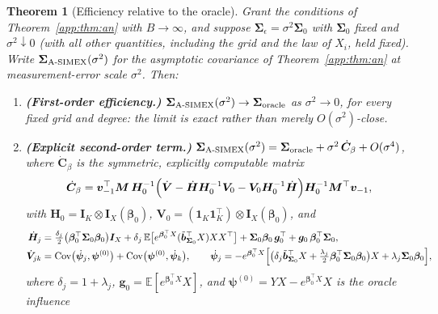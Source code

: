 \documentclass[11pt]{article}
\theoremstyle{plain}
\newtheorem{theorem}{Theorem}
\theoremstyle{definition}
\newcommand{\E}{\mathbb{E}}
\newcommand{\Cov}{\mathrm{Cov}}
\newcommand{\bet}{\bm{\beta}}
\newcommand{\bSig}{\bm{\Sigma}}
\newcommand{\btH}{\bm{H}}
\newcommand{\btV}{\bm{V}}
\newcommand{\bI}{\bm{I}}
\newcommand{\asimex}{\textup{A-SIMEX}}
\begin{document}
\begin{theorem}[Efficiency relative to the oracle]\label{app:thm:are}
Grant the conditions of Theorem~\ref{app:thm:an} with $B\to\infty$, and
suppose $\bSig_\epsilon=\sigma^2\bSig_0$ with $\bSig_0$ fixed and
$\sigma^2\downarrow0$ (with all other quantities, including the grid and
the law of $X_i$, held fixed). Write
$\bSig_{\asimex}(\sigma^2)$ for the asymptotic covariance of
Theorem~\ref{app:thm:an} at measurement-error scale $\sigma^2$. Then:
\begin{enumerate}\itemsep2pt
\item[(i)] \textbf{(First-order efficiency.)}
      $\bSig_{\asimex}(\sigma^2)\to\bSig_{\mathrm{oracle}}$
      as $\sigma^2\to0$, for every fixed grid and degree: the limit is
      exact rather than merely $O(\sigma^2)$-close.
\item[(ii)] \textbf{(Explicit second-order term.)}
      $\bSig_{\asimex}(\sigma^2)
      =\bSig_{\mathrm{oracle}}+\sigma^2\,\dot{\bm C}_\beta+O(\sigma^4)$,
      where $\dot{\bm C}_\beta$ is the \emph{symmetric}, explicitly
      computable matrix
      \begin{equation}\label{app:eq:cdot}
        \dot{\bm C}_\beta
        =\bm v_{-1}^\top\bm M\,\bm H_0^{-1}
        \Bigl(\dot{\btV}-\dot{\btH}\bm H_0^{-1}\bm V_0
              -\bm V_0\bm H_0^{-1}\dot{\btH}\Bigr)
        \bm H_0^{-1}\bm M^\top\bm v_{-1},
      \end{equation}
      with $\bm H_0=\bI_K\otimes\bm I_X(\bet_0)$,
      $\bm V_0=(\bm 1_K\bm 1_K^\top)\otimes\bm I_X(\bet_0)$, and
      \begin{align}
        \dot{\btH}_j
        &=\tfrac{\delta_j}{2}\bigl(\bet_0^\top\bSig_0\bet_0\bigr)\bm I_X
          +\delta_j\,\E\bigl[e^{\bet_0^\top X}
             (\tilde{\bm b}_{\bSig_0}^\top X)XX^\top\bigr]
          +\bSig_0\bet_0\,\bm g_0^\top+\bm g_0\,\bet_0^\top\bSig_0,
          \label{app:eq:hdot}\\
        \dot{\btV}_{jk}
        &=\Cov\bigl(\dot{\bm\psi}_j,\bm\psi^{(0)}\bigr)
         +\Cov\bigl(\bm\psi^{(0)},\dot{\bm\psi}_k\bigr),
        \qquad
        \dot{\bm\psi}_j
        =-e^{\bet_0^\top X}
         \Bigl[\bigl(\delta_j\tilde{\bm b}_{\bSig_0}^\top X
                +\tfrac{\lambda_j}{2}\bet_0^\top\bSig_0\bet_0\bigr)X
               +\lambda_j\bSig_0\bet_0\Bigr],
        \label{app:eq:vdot}
      \end{align}
      where $\delta_j=1+\lambda_j$,
      $\bm g_0=\E[e^{\bet_0^\top X}X]$, and
      $\bm\psi^{(0)}=YX-e^{\bet_0^\top X}X$ is the oracle influence

\end{enumerate}
\end{theorem}
\end{document}
